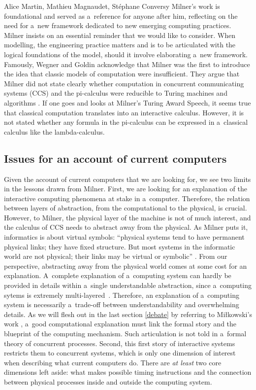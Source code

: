 \begin{artengenv2auth}{Alice Martin, Mathieu Magnaudet, Stéphane Conversy}
Milner's work is foundational and served as a~reference for anyone after him, reflecting on the need for a~new framework dedicated to new emerging computing practices. Milner insists on an essential reminder that we would like to consider. When modelling, the engineering practice matters and is to be articulated with the logical foundations of the model, should it involve elaborating a~new framework. Famously, Wegner and Goldin acknowledge that Milner was the first to introduce the idea that classic models of computation were insufficient. They argue that Milner did not state clearly whether computation in concurrent communicating systems (CCS) and the pi-calculus were reducible to Turing machines and algorithms \parencite{Wegner2003}. If one goes and looks at Milner’s Turing Award Speech, it seems true that classical computation translates into an interactive calculus. However, it is not stated whether any formula in the pi-calculus can be expressed in a~classical calculus like the lambda-calculus.

\subsection{Issues for an account of current computers}

Given the account of current computers that we are looking for, we see two limits in the lessons drawn from Milner.
First, we are looking for an explanation of the interactive computing phenomena at stake in a~computer. Therefore, the relation between layers of abstraction, from the computational to the physical, is crucial. However, to Milner, the physical layer of the machine is not of much interest, and the calculus of CCS needs to abstract away from the physical. As Milner puts it, informatics is about virtual symbols: ``physical systems tend to have permanent physical links; they have fixed structure. But most systems in the informatic world are not physical; their links may be virtual or symbolic'' \parencite{Milner1999}. From our perspective, abstracting away from the physical world comes at some cost for an explanation. A~complete explanation of a~computing system can hardly be provided in details within a~single understandable abstraction, since a~computing sytems is extremely  multi-layered~\parencite{Nisan2005, Plato2018}. Therefore, an explanation of a~computing system is necessarily a~trade-off between understandability and overwhelming details. As we will flesh out in the last section \ref{debate} by referring to Miłkowski’s work \parencite{Mikowski2011, Mikowski2016}, a~good computational explanation must link the formal story and the blueprint of the computing mechanism. Such articulation is not told in a~formal theory of concurrent processes. 
Second, this first story of interactive systems restricts them to concurrent systems, which is only one dimension of interest when describing what current computers do. There are \textit{at least} two core dimensions left aside: what makes possible timing instructions and the connection between physical processes inside and outside the computing system.


\end{artengenv2auth}
